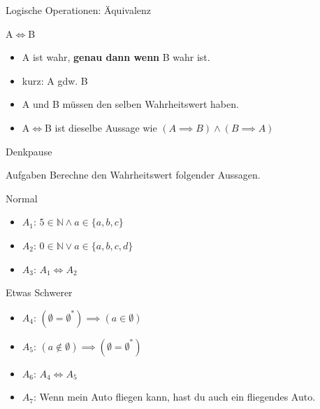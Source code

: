 \begin{frame}{Logische Operationen: Äquivalenz}
\begin{alertblock}{A$\iff$B}
\begin{itemize}
    \item \dq A ist wahr, \textbf{genau dann wenn} B wahr ist.\dq
    \item kurz: \dq A gdw. B\dq
    \item A und B müssen den selben Wahrheitswert haben.
    \item A$\iff$B ist dieselbe Aussage wie $(A \implies B) \wedge (B \implies A)$
\end{itemize}
\end{alertblock}
\end{frame}

{
\begin{frame}[fragile]{Denkpause}
    \begin{alertblock}{Aufgaben}
      Berechne den Wahrheitswert folgender Aussagen. 
    \end{alertblock}
    \begin{block}{Normal}
    \begin{itemize}
        \item $A_1$: $5 \in \mathbb{N} \wedge a \in \{a, b, c\}$
        \item $A_2$: $0 \in \mathbb{N} \vee a \in \{a, b, c, d\}$
        \item $A_3$: $A_1 \iff A_2$
    \end{itemize}
    \end{block}
    \begin{block}{Etwas Schwerer}
    \begin{itemize}
        \item $A_4$: $(\emptyset=\emptyset^{*}) \implies (a \in \emptyset)$
        \item $A_5$: $(a \notin \emptyset) \implies (\emptyset = \emptyset^{*})$
        \item $A_6$: $A_4 \iff A_5$
        \item $A_7$: Wenn mein Auto fliegen kann, hast du auch ein fliegendes Auto.
    \end{itemize}
    \end{block}
\end{frame}
}


